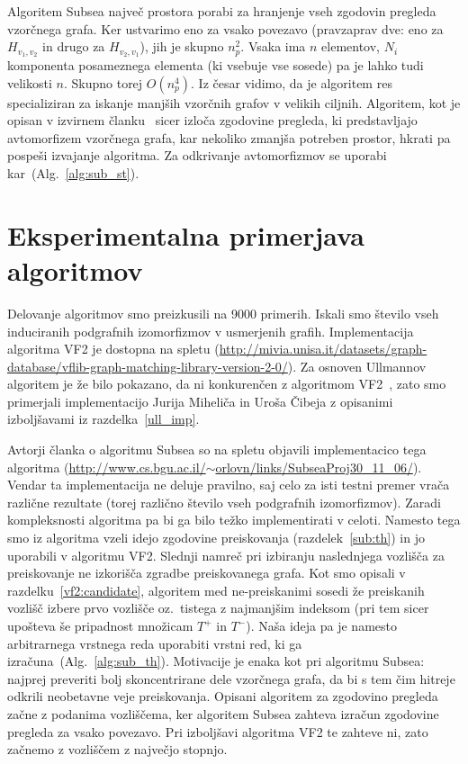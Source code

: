 \documentclass[a4paper, 12pt, ]{book}
\newcommand{\refalg}[1]{(Alg.~\ref{#1})}
\begin{document}
	Algoritem Subsea največ prostora porabi za hranjenje vseh zgodovin pregleda vzorčnega grafa. Ker ustvarimo eno za vsako povezavo (pravzaprav dve:
	eno za $H_{v_1, v_2}$ in drugo za $H_{v_2, v_1}$), jih je skupno $n_p^2$. Vsaka ima $n$ elementov, $N_i$ komponenta posameznega elementa (ki
	vsebuje vse sosede) pa je lahko tudi velikosti $n$. Skupno torej $O(n_p^4)$. Iz česar vidimo, da je algoritem res specializiran za iskanje manjših 
	vzorčnih grafov v velikih ciljnih. Algoritem, kot je opisan v izvirnem članku~\cite{subsea} sicer izloča zgodovine pregleda, ki predstavljajo avtomorfizem
	vzorčnega grafa, kar nekoliko zmanjša potreben prostor, hkrati pa pospeši izvajanje algoritma. Za odkrivanje avtomorfizmov se uporabi 
	kar~\refalg{alg:sub_st}.




\chapter{Eksperimentalna primerjava algoritmov}

	Delovanje algoritmov smo preizkusili na 9000 primerih. Iskali smo število vseh induciranih podgrafnih izomorfizmov v usmerjenih grafih. Implementacija
	algoritma VF2 je dostopna na spletu (\href{http://mivia.unisa.it/datasets/graph-database/vflib-graph-matching-library-version-2-0/}
	{http://mivia.unisa.it/datasets/graph-database/{\allowbreak}vflib-graph-matching-library-version-2-0/}). Za osnoven Ullmannov algoritem je že bilo
	pokazano, da ni konkurenčen z algoritmom VF2~\cite{vf2_2}, zato smo primerjali implementacijo Jurija Miheliča in Uroša Čibeja z opisanimi izboljšavami
	iz razdelka~\ref{ull_imp}.

	Avtorji članka o algoritmu Subsea so na spletu objavili implementacico tega algoritma 
	(\href{http://www.cs.bgu.ac.il/~orlovn/links/SubseaProj30\_11\_06/}{http://www.cs.bgu.ac.il/$\sim$orlovn/links/SubseaProj30\_11\_06/}). Vendar ta
	implementacija ne deluje pravilno, saj celo za isti testni premer vrača različne rezultate (torej različno število vseh podgrafnih izomorfizmov). Zaradi
	kompleksnosti algoritma pa bi ga bilo težko implementirati v celoti. Namesto tega smo iz algoritma vzeli idejo zgodovine preiskovanja 
	(razdelek~\ref{sub:th}) in jo uporabili
	v algoritmu VF2. Slednji namreč pri izbiranju naslednjega vozlišča za preiskovanje ne izkorišča zgradbe preiskovanega grafa. Kot smo opisali v 
	razdelku~\ref{vf2:candidate}, algoritem med ne-preiskanimi sosedi že preiskanih vozlišč izbere prvo vozlišče oz.~tistega z najmanjšim indeksom (pri tem 
	sicer upošteva še pripadnost množicam $T^+$ in $T^-$). Naša ideja pa je namesto arbitrarnega vrstnega reda uporabiti vrstni red, ki ga 
	izračuna~\refalg{alg:sub_th}. Motivacije je enaka kot pri algoritmu Subsea: najprej preveriti bolj skoncentrirane dele vzorčnega grafa, da bi s tem čim
	hitreje odkrili neobetavne veje preiskovanja. Opisani algoritem za zgodovino pregleda začne z podanima vozliščema, ker algoritem Subsea zahteva 
	izračun zgodovine pregleda za vsako povezavo. Pri izboljšavi algoritma VF2 te zahteve ni, zato začnemo z vozliščem z največjo stopnjo.
	
\end{document}
